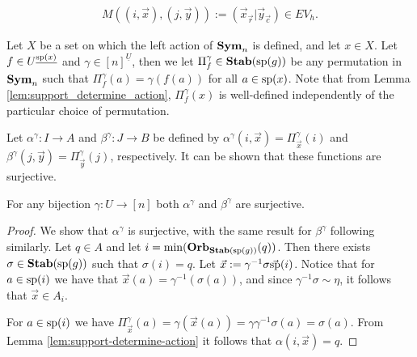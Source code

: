 \documentclass[../paper.tex]{subfiles}
\begin{document}
\begin{align*}
  M((i , \vec{x}), (j, \vec{y})) := (\vec{x}_{\vec{r}} \vert \vec{y}_{\vec{c}}) \in EV_h.
\end{align*}



Let $X$ be a set on which the left action of $\text{\textbf{Sym}}_n$ is defined, and let $x \in
X$. Let $f \in U^{\underline{\text{sp}(x)}}$ and $\gamma\in [n]^{\underline{U}}$,
then we let $\Pi^{\gamma}_{f} \in \text{\textbf{Stab}} (\text{sp} (g))$ be any permutation in $\text{\textbf{Sym}}_n$
such that $\Pi^{\gamma}_f (a) = \gamma (f(a))$ for all $a \in \text{sp}(x)$. Note
that from Lemma \ref{lem:support_determine_action}, $\Pi^{\gamma}_f(x)$ is
well-defined independently of the particular choice of permutation.

Let $\alpha^{\gamma}: I \rightarrow A$ and $\beta^{\gamma}: J \rightarrow B$ be
defined by $\alpha^{\gamma} (i, \vec{x}) = \Pi^{\gamma}_{\vec{x}}(i)$ and
$\beta^{\gamma} (j, \vec{y}) = \Pi^{\gamma}_{\vec{y}}(j)$, respectively. It can
be shown that these functions are surjective.

\begin{lem} 
  For any bijection $\gamma : U \rightarrow [n]$ both $\alpha^{\gamma}$ and
  $\beta^{\gamma}$ are surjective.
  \label{lem:alpha-beta-surjective}
\end{lem}
\begin{proof}
  We show that $\alpha^{\gamma}$ is surjective, with the same result for
  $\beta^{\gamma}$ following similarly. Let $q \in A$ and let $i = \min
  (\text{\textbf{Orb}}_{\text{\textbf{Stab}} (\text{sp} (g))} (q))$. Then there exists $\sigma \in \text{\textbf{Stab}} (\text{sp} (g))$ such that
  $\sigma (i) = q$. Let $\vec{x} := \gamma^{-1} \sigma \vec{\text{sp}}(i)$. Notice
  that for $a \in \text{sp}(i)$ we have that $\vec{x}(a) = \gamma^{-1} (\sigma
  (a))$, and since $\gamma^{-1} \sigma \sim \eta$, it follows that $\vec{x} \in
  A_i$.

  For $a \in \text{sp}(i)$ we have $\Pi^{\gamma}_{\vec{x}} (a) = \gamma
  (\vec{x}(a)) = \gamma \gamma^{-1} \sigma (a) = \sigma (a)$. From Lemma
  \ref{lem:support-determine-action} it follows that $\alpha(i, \vec{x}) = q$.
\end{proof}
\end{document}
